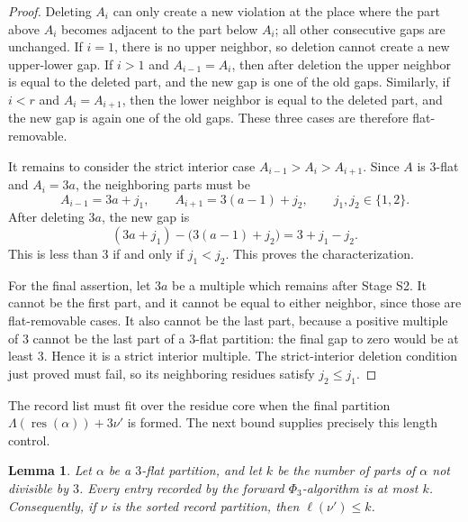 \documentclass[11pt]{amsart}
\newtheorem{lemma}[theorem]{Lemma}
\theoremstyle{definition}
\theoremstyle{remark}
\newcommand{\res}{\operatorname{res}}
\begin{document}
\begin{proof}
Deleting $A_i$ can only create a new violation at the place where the part above
$A_i$ becomes adjacent to the part below $A_i$; all other consecutive gaps are
unchanged.  If $i=1$, there is no upper neighbor, so deletion cannot create a
new upper-lower gap.  If $i>1$ and $A_{i-1}=A_i$, then after deletion the upper
neighbor is equal to the deleted part, and the new gap is one of the old gaps.
Similarly, if $i<r$ and $A_i=A_{i+1}$, then the lower neighbor is equal to the
deleted part, and the new gap is again one of the old gaps.  These three cases
are therefore flat-removable.

It remains to consider the strict interior case
$A_{i-1}>A_i>A_{i+1}$.  Since $A$ is $3$-flat and $A_i=3a$, the neighboring
parts must be
\[
        A_{i-1}=3a+j_1,
        \qquad
        A_{i+1}=3(a-1)+j_2,
        \qquad j_1,j_2\in\{1,2\}.
\]
After deleting $3a$, the new gap is
\[
        (3a+j_1)-\bigl(3(a-1)+j_2\bigr)=3+j_1-j_2.
\]
This is less than $3$ if and only if $j_1<j_2$.  This proves the characterization.

For the final assertion, let $3a$ be a multiple which remains after Stage S2.  It
cannot be the first part, and it cannot be equal to either neighbor, since those
are flat-removable cases.  It also cannot be the last part, because a positive
multiple of $3$ cannot be the last part of a $3$-flat partition: the final gap to
zero would be at least $3$.  Hence it is a strict interior multiple.  The
strict-interior deletion condition just proved must fail, so its neighboring
residues satisfy $j_2\le j_1$.
\end{proof}

The record list must fit over the residue core when the final partition $\Lambda(\res(\alpha))+3\nu'$ is formed.  The next bound supplies precisely this length control.

\begin{lemma}\label{lem:record-bound}
Let $\alpha$ be a $3$-flat partition, and let $k$ be the number of parts of
$\alpha$ not divisible by $3$.  Every entry recorded by the forward
$\Phi_3$-algorithm is at most $k$.  Consequently, if $\nu$ is the sorted record
partition, then $\ell(\nu')\le k$.
\end{lemma}
\end{document}
